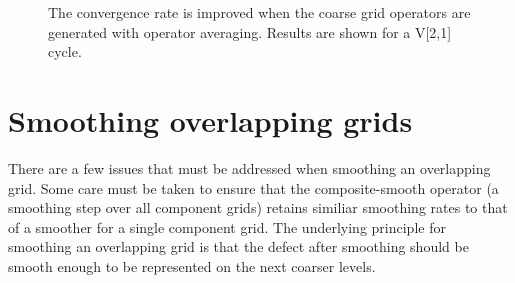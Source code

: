 \documentclass{article}
\begin{document}
{
\renewcommand{\figWidth}{6.cm}
\newcommand{\trimfig}[2]{\trimhb{#1}{#2}{.0}{.0}{.0}{.0}}
\begin{figure}[hbt]
\begin{center}
\end{center}
\caption{The convergence rate is improved when the coarse grid operators are generated
with operator averaging. Results are shown for a V[2,1] cycle.}
\label{fig:opAveComparison}
\end{figure}
}




\clearpage
\section{Smoothing overlapping grids}

There are a few issues that must be addressed when smoothing an overlapping grid.
Some care must be taken to ensure that the composite-smooth operator (a smoothing step
over all component grids) retains similiar smoothing rates to that of a smoother for a 
single component grid. The underlying principle for smoothing an overlapping
grid is that the defect after smoothing should be smooth enough to be represented 
on the next coarser levels.
\end{document}
